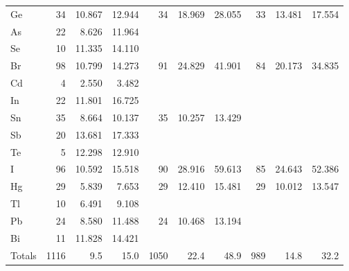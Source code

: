 \begin{table}
\begin{center}
\begin{tabular}{lrrrrrrrrr}
 Ge &  34 &   10.867 &   12.944 &  34 &   18.969 &   28.055 &  33 &   13.481 &   17.554 \\
 As &  22 &    8.626 &   11.964 &     &          &          &     &          &          \\
 Se &  10 &   11.335 &   14.110 &     &          &          &     &          &          \\
 Br &  98 &   10.799 &   14.273 &  91 &   24.829 &   41.901 &  84 &   20.173 &   34.835 \\
 Cd &   4 &    2.550 &    3.482 &     &          &          &     &          &          \\
 In &  22 &   11.801 &   16.725 &     &          &          &     &          &          \\
 Sn &  35 &    8.664 &   10.137 &  35 &   10.257 &   13.429 &     &          &          \\
 Sb &  20 &   13.681 &   17.333 &     &          &          &     &          &          \\
 Te &   5 &   12.298 &   12.910 &     &          &          &     &          &          \\
  I &  96 &   10.592 &   15.518 &  90 &   28.916 &   59.613 &  85 &   24.643 &   52.386 \\
 Hg &  29 &    5.839 &    7.653 &  29 &   12.410 &   15.481 &  29 &   10.012 &   13.547 \\
 Tl &  10 &    6.491 &    9.108 &     &          &          &     &          &          \\
 Pb &  24 &    8.580 &   11.488 &  24 &   10.468 &   13.194 &     &          &          \\
 Bi &  11 &   11.828 &   14.421 &     &          &          &     &          &          \\ \hline
 Totals &  1116 &  9.5  & 15.0  &   1050  & 22.4  & 48.9   &   989  & 14.8    & 32.2 \\
 \hline
\end{tabular}
\end{center}
\end{table}
